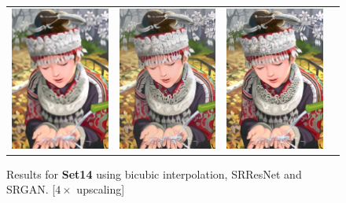 \documentclass[10pt,twocolumn,letterpaper]{article}
\begin{document}
\begin{figure}[h!]
\begin{tabular}{cccc}
\includegraphics[width=1.5in]{images/used/appendix/jpg/Set14/comic_SRResNet-MSE} &
\includegraphics[width=1.5in]{images/used/appendix/jpg/Set14/comic_SRGAN-VGG54} &
\includegraphics[width=1.5in]{images/used/appendix/jpg/Set14/comic_HR} \\
\end{tabular}
\label{fig:app_Set14a}
\caption{Results for \textbf{Set14} using bicubic interpolation, SRResNet and SRGAN. [$4\times$ upscaling]}
\end{figure}
\end{document}
